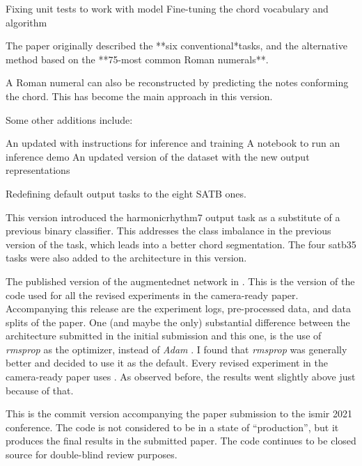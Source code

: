 Fixing unit tests to work with  model
Fine-tuning the chord vocabulary and
 algorithm


The paper originally described the **six conventional*tasks,
and the alternative method based on the **75-most common
Roman numerals**.

A Roman numeral can also be reconstructed by predicting the
notes conforming the chord. This has become the main
approach in this version.

Some other additions include:

An updated  with instructions for inference and
training A notebook to run an inference demo An updated
version of the dataset with the new output representations

Redefining default output tasks to the eight SATB ones.

This version introduced the \gls{harmonicrhythm7} output
task as a substitute of a previous binary classifier. This
addresses the class imbalance in the previous version of the
task, which leads into a better chord segmentation. The four
\gls{satb35} tasks were also added to the architecture in
this version. 

The published version of the \gls{augmentednet} network in
\textcite{napoleslopez2021augmentednet}. This is the version
of the code used for all the revised experiments in the
camera-ready paper. Accompanying this release are the
experiment logs, pre-processed data, and data splits of the
paper. One (and maybe the only) substantial difference
between the architecture submitted in the initial submission
and this one, is the use of \emph{rmsprop} as the optimizer,
instead of \emph{Adam} \parencite{kingma2014adam}. I found
that \emph{rmsprop} was generally better and decided to use
it as the default. Every revised experiment in the
camera-ready paper uses . As observed before,
the results went slightly above just because of that.

This is the commit version accompanying the paper submission
to the \gls{ismir} 2021 conference. The code is not
considered to be in a state of ``production'', but it
produces the final results in the submitted paper. The code
continues to be closed source for double-blind review
purposes.

